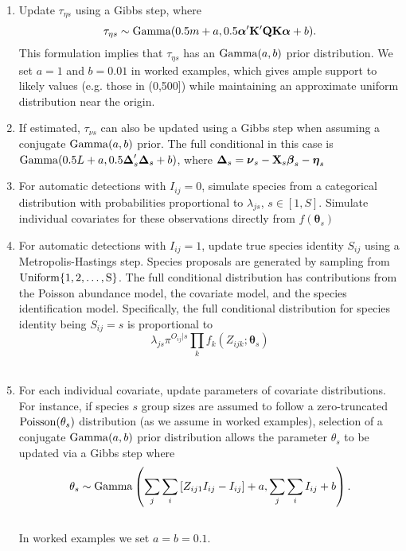 \documentclass[12pt,fleqn]{article}
\begin{document}
\begin{flushleft}
\begin{enumerate}
  \item Update $\tau_{\eta s}$ using a Gibbs step, where
  \begin{equation*}
  \tau_{\eta s} \sim {\rm Gamma}(0.5m + a,0.5 \boldsymbol{\alpha}^\prime
  {\bf K}^\prime {\bf Q} {\bf K}\boldsymbol{\alpha}+b).
  \end{equation*}
  This formulation implies that $\tau_{\eta s}$ has an ${\rm Gamma}(a,b)$ prior distribution. We set $a=1$ and $b=0.01$ in worked examples, which gives ample support to likely values (e.g. those in (0,500]) while maintaining an approximate uniform distribution near the origin. \\


  \item If estimated, $\tau_{\nu s}$ can also be updated using a Gibbs step when assuming a conjugate
      ${\rm Gamma}(a,b)$ prior.  The full conditional in this case is ${\rm Gamma}(0.5L+a,0.5 \boldsymbol{\Delta}_s^\prime \boldsymbol{\Delta}_s +b)$, where $\boldsymbol{\Delta}_s=\boldsymbol{\nu}_s-{\bf X}_s \boldsymbol{\beta}_s-\boldsymbol{\eta}_s$ \\

  \item For automatic detections with $I_{ij}=0$, simulate species from a categorical distribution with probabilities proportional to $\lambda_{js}$, $s \in [1,S]$.  Simulate individual covariates for these observations directly from $f(\boldsymbol{\theta}_s)$ \\

  \item For automatic detections with $I_{ij}=1$, update true species identity $S_{ij}$ using a Metropolis-Hastings step.  Species proposals are generated by sampling from $\rm{Uniform}\{1,2,\hdots,S\}$.  The full conditional distribution has contributions from the Poisson abundance model, the covariate model, and the species identification model.  Specifically, the full conditional distribution for species identity being $S_{ij}=s$ is proportional to
      \begin{equation*}
        \lambda_{js} \pi^{O_{ij}|s} \prod_k f_k(Z_{ijk} ; \boldsymbol{\theta}_s)
      \end{equation*} \\

  \item For each individual covariate, update parameters of covariate distributions.  For instance, if species $s$ group sizes are assumed to follow a zero-truncated ${\rm Poisson}(\theta_s)$ distribution (as we assume in worked examples), selection of a conjugate ${\rm Gamma}(a,b)$ prior distribution allows the parameter $\theta_s$ to be updated via a Gibbs step where
       \begin{equation*}
       \theta_s \sim {\rm Gamma}\left( \sum_j \sum_i \left[ Z_{ij1} I_{ij} -I_{ij} \right] + a,\sum_j \sum_i I_{ij} + b \right).
       \end{equation*} \\
       In worked examples we set $a=b=0.1$.


\end{enumerate}
\end{flushleft}
\end{document}
